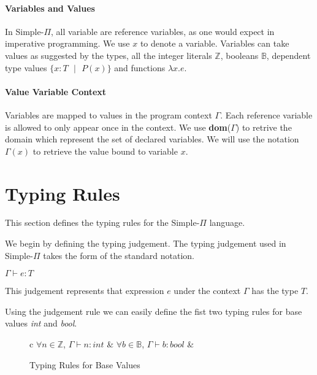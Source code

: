 \documentclass[a4paper,12pt]{report}
\begin{document}
\paragraph{Variables and Values} In Simple-$\Pi$, all variable are reference 
variables, as one would expect in imperative programming. We use $x$ to denote a 
variable. Variables can take values as suggested by the types, all the integer 
literals $\mathbb{Z}$, booleans $\mathbb{B}$, dependent type values 
$\{x: T\text{ }|\text{ }P(x)\}$ and functions $\lambda x.e$.

\paragraph{Value Variable Context} Variables are mapped to values in the program 
context $\Gamma$. Each reference variable is allowed to only appear once in 
the context. We use \textbf{dom}($\Gamma$) to retrive the domain which represent 
the set of declared variables. We will use the notation $\Gamma(x)$ 
to retrieve the value bound to variable $x$.

\section{Typing Rules}
This section defines the typing rules for the Simple-$\Pi$ language.

\par
We begin by defining the typing judgement. The typing judgement used in 
Simple-$\Pi$ takes the form of the standard notation. 
\begin{center}
  $\Gamma \vdash e : T$
\end{center}
This judgement represents that expression $e$ under the context $\Gamma$ has the 
type $T$.

\par
Using the judgement rule we can easily define the fist two typing rules for base 
values \textit{int} and \textit{bool}.

\begin{figure}[H]
  \begin{center}
    \begin{tabular} {c}
      $\forall n \in \mathbb{Z}$, $\Gamma \vdash n : int$ & 
      $\forall b \in \mathbb{B}$, $\Gamma \vdash b : bool$ &       
    \end{tabular}
  \end{center}
  \caption{Typing Rules for Base Values}
\end{figure}
\end{document}
